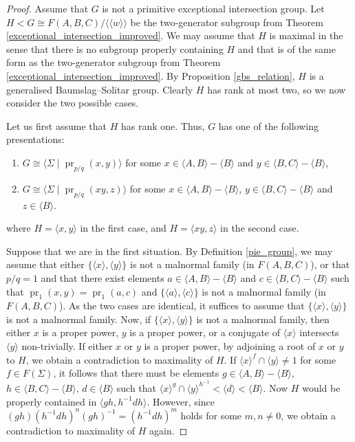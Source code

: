 \documentclass[11pt, a4paper]{amsart}
\theoremstyle{definition}
\newcommand{\isom}{\cong}
\newcommand{\normal}[1]{\langle\langle #1 \rangle\rangle}
\DeclareMathOperator{\pr}{pr}
\newcounter{cases}
\begin{document}
\begin{proof}
Assume that $G$ is not a primitive exceptional intersection group. Let $H<G \isom F(A, B, C)/\normal{w}$ be the two-generator subgroup from Theorem \ref{exceptional_intersection_improved}. We may assume that $H$ is maximal in the sense that there is no subgroup properly containing $H$ and that is of the same form as the two-generator subgroup from Theorem \ref{exceptional_intersection_improved}. By Proposition \ref{gbs_relation}, $H$ is a generalised Baumslag--Solitar group. Clearly $H$ has rank at most two, so we now consider the two possible cases.

Let us first assume that $H$ has rank one. Thus, $G$ has one of the following presentations:
\begin{enumerate}
\item $G \isom \langle \Sigma \mid \pr_{p/q}(x, y)\rangle$ for some $x\in \langle A, B\rangle - \langle B\rangle$ and $y\in \langle B, C\rangle - \langle B\rangle$,
\item $G\isom \langle \Sigma \mid \pr_{p/q}(xy, z)\rangle$ for some $x\in \langle A, B\rangle - \langle B\rangle$, $y\in \langle B, C\rangle - \langle B\rangle$ and $z\in \langle B\rangle$.
\end{enumerate}
where $H = \langle x, y\rangle$ in the first case, and $H = \langle xy, z\rangle$ in the second case. 

Suppose that we are in the first situation. By Definition \ref{pie_group}, we may assume that either $\{\langle x\rangle, \langle y\rangle\}$ is not a malnormal family (in $F(A, B, C)$), or that $p/q = 1$ and that there exist elements $a\in \langle A, B\rangle - \langle B\rangle$ and $c\in \langle B, C\rangle - \langle B\rangle$ such that $\pr_1(x, y) = \pr_1(a, c)$ and $\{\langle a\rangle, \langle c\rangle\}$ is not a malnormal family (in $F(A, B, C)$). As the two cases are identical, it suffices to assume that $\{\langle x\rangle, \langle y\rangle\}$ is not a malnormal family. Now, if $\{\langle x\rangle, \langle y\rangle\}$ is not a malnormal family, then either $x$ is a proper power, $y$ is a proper power, or a conjugate of $\langle x\rangle$ intersects $\langle y\rangle$ non-trivially. If either $x$ or $y$ is a proper power, by adjoining a root of $x$ or $y$ to $H$, we obtain a contradiction to maximality of $H$. If $\langle x\rangle^f\cap \langle y\rangle \neq 1$ for some $f\in F(\Sigma)$, it follows that there must be elements $g\in \langle A, B\rangle - \langle B\rangle$, $h\in \langle B, C\rangle -\langle B\rangle$, $d\in \langle B\rangle$ such that $\langle x\rangle^g\cap \langle y\rangle^{h^{-1}} < \langle d\rangle<\langle B\rangle$. Now $H$ would be properly contained in $\langle gh, h^{-1}dh\rangle$. However, since $(gh)(h^{-1}dh)^n(gh)^{-1} = (h^{-1}dh)^m$ holds for some $m, n\neq 0$, we obtain a contradiction to maximality of $H$ again.


\end{proof}
\end{document}
